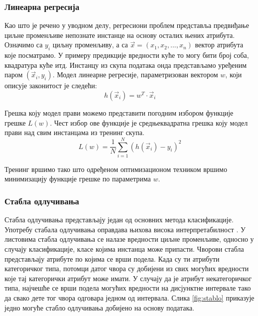 \documentclass[a4paper]{article}
\begin{document}
{\subsubsection*{Линеарна регресија}
Као што је речено у уводном делу, регресиони проблем представља предвиђање циљне променљиве непознате инстанце на основу осталих њених атрибута. Означимо са $y_i$ циљну променљиву, а са $\vec{x} = (x_1, x_2, ..., x_n)$ вектор атрибута које посматрамо. У примеру предикције вредности куће то могу бити број соба, квадратура куће итд. Инстанцу из скупа података онда представљамо уређеним паром $(\vec{x}_i, y_i)$. Модел линеарне регресије, параметризован вектором $w$, који описује законитост је следећи:
\begin{equation}
    h(\vec{x}_i) = w^T \cdot \vec{x}_i
\end{equation}


Грешка коју модел прави можемо представити погодним избором функције грешке $L(w)$. Чест избор ове функције је средњеквадратна грешка коју модел прави над свим инстанцама из тренинг скупа.
\begin{equation}
L(w) = \frac{1}{N}\sum \limits_{i=1}^{N} (h(\vec{x}_i) - y_i)^2
\end{equation}

Тренинг вршимо тако што одређеном оптимизационом техником вршимо минимизацију функције грешке по параметрима $w$.


\subsubsection*{Стабла одлучивања}
Стабла одлучивања представљају један од основних метода класификације. Употребу стабала одлучивања оправдава њихова висока интерпретабилност \cite{dct-survey}. У листовима стабла одлучивања се налазе вредности циљне променљиве, односно у случају класификације, класе којима инстанца може припасти. Чворови стабла представљају атрибуте по којима се врши подела. Када су ти атрибути категоричког типа, потомци датог чвора су добијени из свих могућих вредности које тај категорички атрибут може имати. У случају да је атрибут некатегоричког типа, најчешће се врши подела могућих вредности на дисјунктне интервале тако да свако дете тог чвора одговара једном од интервала. Слика \ref{fig:stablo} приказује једно могуће стабло одлучивања добијено на основу података.

}
\end{document}
